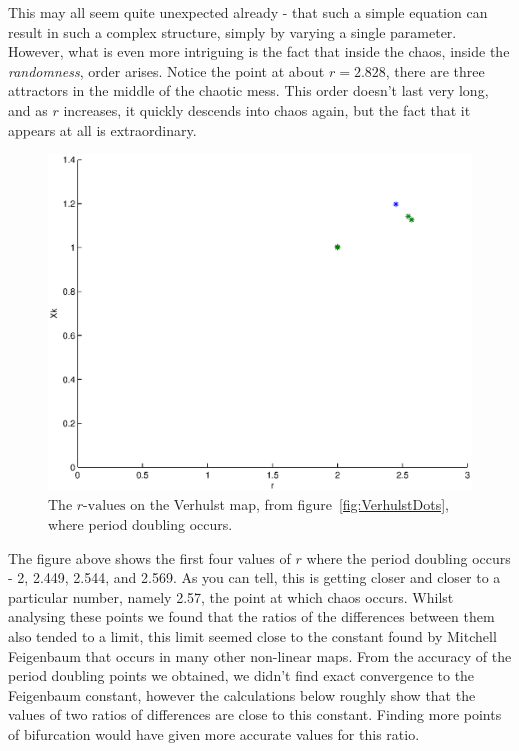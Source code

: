 \documentclass[a4wide, 10pt]{article}
\begin{document}
This may all seem quite unexpected already - that such a simple equation can result
 in such a complex structure, simply by varying a single parameter. However, what is
  even more intriguing is the fact that inside the chaos, inside the \emph{randomness}, 
   order arises. Notice the point at about $r = 2.828$, there are 
    three attractors in the middle of the chaotic mess. This order doesn't last very long, and as
     $r$ increases, it quickly descends into chaos again, but the fact that it appears at all is
      extraordinary. 



\begin{figure}[H]

    \centering

    \includegraphics[scale=0.2]{EPSFiles/MAINVerhulstPointsEPS}

    \caption{The $r \textrm{-values}$ on the Verhulst map, from figure~\ref{fig:VerhulstDots}, where period doubling occurs.}
    
    \label{fig:VerhulstPoints}

\end{figure}

The figure above shows the first four values of $r$ where the period doubling occurs
 - 2, 2.449, 2.544, and 2.569. As you can tell, this is getting closer and closer to
  a particular number, namely 2.57, the point at which chaos occurs. Whilst analysing
   these points we found that the ratios of the differences between them also tended to a 
   	limit, this limit seemed close to the constant found by Mitchell Feigenbaum that occurs in
   	 many other non-linear maps\cite{Verhulst Map Period Doubling Information}. From the accuracy of the period doubling points we obtained, we didn't find exact convergence to the Feigenbaum constant, however the calculations below roughly show that the values of two ratios of differences are close to this constant. Finding more points of bifurcation would have given more accurate values for this ratio.	 
   	  
\end{document}
